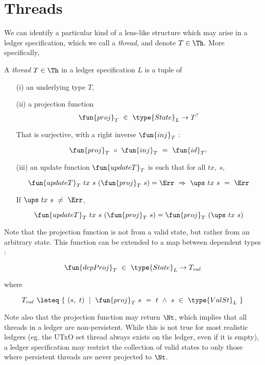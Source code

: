 \section{Threads}
\label{sec:threads}

We can identify a particular kind of a lens-like structure which may arise in a ledger specification,
which we call a \emph{thread}, and denote $T \in \Th$. More specifically,

\begin{definition}
  A \emph{thread} $T \in \Th$ in a ledger specification $L$ is a tuple of
  \begin{itemize}
    \item[(i)] an underlying type $T$,

    \item[(ii)] a projection function
    \[ \fun{proj}_T ~\in~\type{State}_L \to T^? \]

    That is surjective, with a right inverse $\fun{inj}_T$ :

    \[ \fun{proj}_T~\circ~\fun{inj}_T ~=~\fun{id}_{T^?} \]

    \item[(iii)] an update function $\fun{updateT}_T$ is such that
    for all $tx,~s$,

    \[ \fun{updateT}_T~tx~s~(\fun{proj}_T~s) = \Err~ \Rightarrow~ \ups~tx~s~=~ \Err \]

    If $\ups~tx~s~\neq~ \Err$,

    \[ \fun{updateT}_T~tx~s~(\fun{proj}_T~s) = \fun{proj}_T~(\ups~tx~s)\]
  \end{itemize}
\end{definition}

Note that the projection function is not from a valid state, but rather from an
arbitrary state. This function can be extended to a map between dependent types :

\[ \fun{depProj}_T ~\in~\type{State}_L \to T_{val} \]

where

\[ T_{val}~\leteq~\{ ~(s,~t)~ \mid~\fun{proj}_T~s~=~t~\wedge~s~\in~\type{ValSt}_L~ \} \]

Note also that the projection function may return $\Nt$, which implies that all threads
in a ledger are non-persistent. While this is not true for most realistic ledgers
(eg. the UTxO set thread always exists on the ledger, even if it is empty), a ledger specification may
restrict the collection of valid states to only those where persistent threads
are never projected to $\Nt$.

